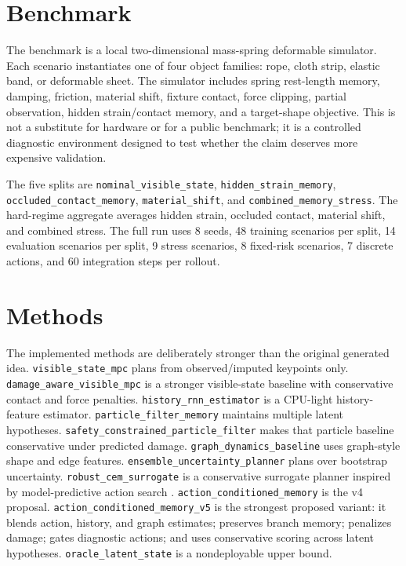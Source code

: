 \documentclass{article}
\begin{document}
\section{Benchmark}
The benchmark is a local two-dimensional mass-spring deformable simulator. Each scenario instantiates one of four object families: rope, cloth strip, elastic band, or deformable sheet. The simulator includes spring rest-length memory, damping, friction, material shift, fixture contact, force clipping, partial observation, hidden strain/contact memory, and a target-shape objective. This is not a substitute for hardware or for a public benchmark; it is a controlled diagnostic environment designed to test whether the claim deserves more expensive validation.

The five splits are \texttt{nominal\_visible\_state}, \texttt{hidden\_strain\_memory}, \texttt{occluded\_contact\_memory}, \texttt{material\_shift}, and \texttt{combined\_memory\_stress}. The hard-regime aggregate averages hidden strain, occluded contact, material shift, and combined stress. The full run uses 8 seeds, 48 training scenarios per split, 14 evaluation scenarios per split, 9 stress scenarios, 8 fixed-risk scenarios, 7 discrete actions, and 60 integration steps per rollout.

\section{Methods}
The implemented methods are deliberately stronger than the original generated idea. \texttt{visible\_state\_mpc} plans from observed/imputed keypoints only. \texttt{damage\_aware\_visible\_mpc} is a stronger visible-state baseline with conservative contact and force penalties. \texttt{history\_rnn\_estimator} is a CPU-light history-feature estimator. \texttt{particle\_filter\_memory} maintains multiple latent hypotheses. \texttt{safety\_constrained\_particle\_filter} makes that particle baseline conservative under predicted damage. \texttt{graph\_dynamics\_baseline} uses graph-style shape and edge features. \texttt{ensemble\_uncertainty\_planner} plans over bootstrap uncertainty. \texttt{robust\_cem\_surrogate} is a conservative surrogate planner inspired by model-predictive action search \citep{rawlings2017mpc}. \texttt{action\_conditioned\_memory} is the v4 proposal. \texttt{action\_conditioned\_memory\_v5} is the strongest proposed variant: it blends action, history, and graph estimates; preserves branch memory; penalizes damage; gates diagnostic actions; and uses conservative scoring across latent hypotheses. \texttt{oracle\_latent\_state} is a nondeployable upper bound.
\end{document}
